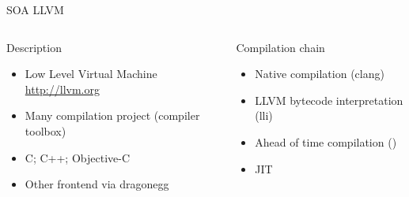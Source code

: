 %
\begin{Frame}{SOA LLVM}
  \begin{columns}[t]
    \begin{column}{5cm} %
      \begin{block}{Description}
        \begin{itemize}
        \item Low Level Virtual Machine \url{http://llvm.org}
        \item Many compilation project (compiler toolbox)
        \item C; C++; Objective-C
        \item Other frontend via dragonegg
        \end{itemize}
      \end{block} 
    \end{column}
    
    \begin{column}{5cm} %
      \begin{block}{Compilation chain}
        \begin{itemize}
        \item Native compilation (clang)
        \item LLVM bytecode interpretation (lli)
        \item Ahead of time compilation ()
        \item JIT
        \end{itemize}
      \end{block}   
    \end{column}
  \end{columns}  

\end{Frame}


